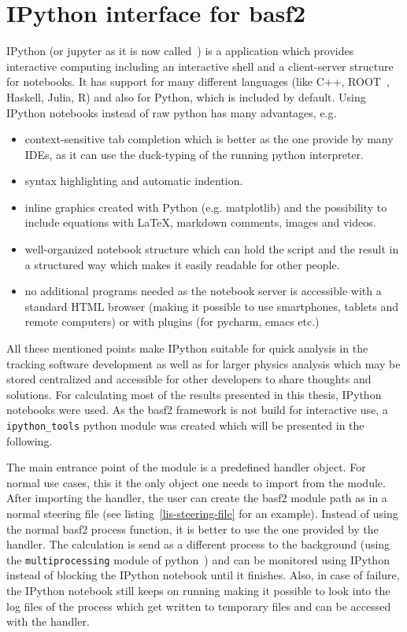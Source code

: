 \section{IPython interface for basf2}

IPython (or jupyter as it is now called~\cite{jupyter}) is a application which provides interactive computing including an interactive shell and a client-server structure for notebooks. It has support for many different languages (like C++, ROOT~\cite{root_ipython}, Haskell, Julia, R) and also for Python, which is included by default. Using IPython notebooks instead of raw python has many advantages, e.g.
\begin{itemize}
  \item context-sensitive tab completion which is better as the one provide by many IDEs, as it can use the duck-typing of the running python interpreter.
  \item syntax highlighting and automatic indention.
  \item inline graphics created with Python (e.g. matplotlib) and the possibility to include equations with \LaTeX, markdown comments, images and videos.
  \item well-organized notebook structure which can hold the script and the result in a structured way which makes it easily readable for other people.
  \item no additional programs needed as the notebook server is accessible with a standard HTML browser (making it possible to use smartphones, tablets and remote computers) or with plugins (for pycharm, emacs etc.)
\end{itemize}

All these mentioned points make IPython suitable for quick analysis in the tracking software development as well as for larger physics analysis which may be stored centralized and accessible for other developers to share thoughts and solutions. For calculating most of the results presented in this thesis, IPython notebooks were used. As the basf2 framework is not build for interactive use, a \texttt{ipython\_tools} python module was created which will be presented in the following.

The main entrance point of the module is a predefined handler object. For normal use cases, this it the only object one needs to import from the module. After importing the handler, the user can create the basf2 module path as in a normal steering file (see listing~\ref{lis-steering-file} for an example). Instead of using the normal basf2 process function, it is better to use the one provided by the handler. The calculation is send as a different process to the background (using the \texttt{multiprocessing} module of python~\cite{multiprocessing}) and can be monitored using IPython instead of blocking the IPython notebook until it finishes. Also, in case of failure, the IPython notebook still keeps on running making it possible to look into the log files of the process which get written to temporary files and can be accessed with the handler.

